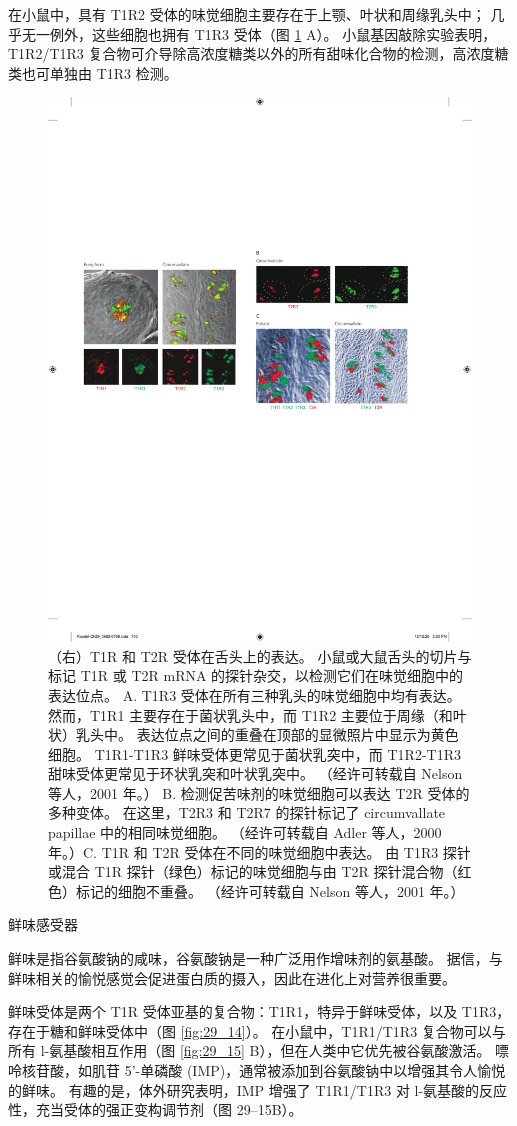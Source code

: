 在小鼠中，具有 T1R2 受体的味觉细胞主要存在于上颚、叶状和周缘乳头中； 几乎无一例外，这些细胞也拥有 T1R3 受体（图 \ref{fig:29_16} A）。
小鼠基因敲除实验表明，T1R2/T1R3 复合物可介导除高浓度糖类以外的所有甜味化合物的检测，高浓度糖类也可单独由 T1R3 检测。

\begin{figure}[htbp]
	\centering
	\includegraphics[width=0.5\linewidth]{chap29/fig_29_16}
	\caption{（右）T1R 和 T2R 受体在舌头上的表达。 小鼠或大鼠舌头的切片与标记 T1R 或 T2R mRNA 的探针杂交，以检测它们在味觉细胞中的表达位点。 A. T1R3 受体在所有三种乳头的味觉细胞中均有表达。 然而，T1R1 主要存在于菌状乳头中，而 T1R2 主要位于周缘（和叶状）乳头中。 表达位点之间的重叠在顶部的显微照片中显示为黄色细胞。 T1R1-T1R3 鲜味受体更常见于菌状乳突中，而 T1R2-T1R3 甜味受体更常见于环状乳突和叶状乳突中。 （经许可转载自 Nelson 等人，2001 年。） B. 检测促苦味剂的味觉细胞可以表达 T2R 受体的多种变体。 在这里，T2R3 和 T2R7 的探针标记了 circumvallate papillae 中的相同味觉细胞。 （经许可转载自 Adler 等人，2000 年。）C. T1R 和 T2R 受体在不同的味觉细胞中表达。 由 T1R3 探针或混合 T1R 探针（绿色）标记的味觉细胞与由 T2R 探针混合物（红色）标记的细胞不重叠。 （经许可转载自 Nelson 等人，2001 年。）}
	\label{fig:29_16}
\end{figure}


鲜味感受器

鲜味是指谷氨酸钠的咸味，谷氨酸钠是一种广泛用作增味剂的氨基酸。 据信，与鲜味相关的愉悦感觉会促进蛋白质的摄入，因此在进化上对营养很重要。

鲜味受体是两个 T1R 受体亚基的复合物：T1R1，特异于鲜味受体，以及 T1R3，存在于糖和鲜味受体中（图 \ref{fig:29_14}）。 在小鼠中，T1R1/T1R3 复合物可以与所有 l-氨基酸相互作用（图 \ref{fig:29_15} B），但在人类中它优先被谷氨酸激活。 嘌呤核苷酸，如肌苷 5'-单磷酸 (IMP)，通常被添加到谷氨酸钠中以增强其令人愉悦的鲜味。 有趣的是，体外研究表明，IMP 增强了 T1R1/T1R3 对 l-氨基酸的反应性，充当受体的强正变构调节剂（图 29–15B）。

